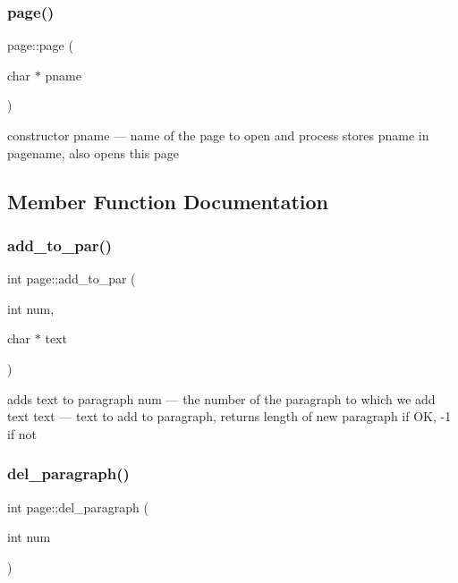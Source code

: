 \subsubsection{\texorpdfstring{page()}{page()}}
{\footnotesize\ttfamily page\+::page (\begin{DoxyParamCaption}\item[{char $\ast$}]{pname }\end{DoxyParamCaption})\hspace{0.3cm}{\ttfamily [inline]}}

constructor pname --- name of the page to open and process stores pname in pagename, also opens this page 

\subsection{Member Function Documentation}
\mbox{\label{classpage_a03e597adceb2d5147a1729d6517df5b4}} 
\subsubsection{\texorpdfstring{add\+\_\+to\+\_\+par()}{add\_to\_par()}}
{\footnotesize\ttfamily int page\+::add\+\_\+to\+\_\+par (\begin{DoxyParamCaption}\item[{int}]{num,  }\item[{char $\ast$}]{text }\end{DoxyParamCaption})}

adds text to paragraph num --- the number of the paragraph to which we add text text --- text to add to paragraph, returns length of new paragraph if OK, -\/1 if not \mbox{\label{classpage_a1c55a90abfcc823c8216c9dad7660f24}} 
\subsubsection{\texorpdfstring{del\+\_\+paragraph()}{del\_paragraph()}}
{\footnotesize\ttfamily int page\+::del\+\_\+paragraph (\begin{DoxyParamCaption}\item[{int}]{num }\end{DoxyParamCaption})}

